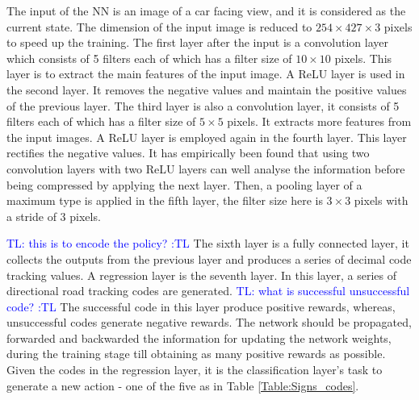 \documentclass{svproc}
\newcommand{\tl}[1]{\textcolor{blue} {TL: #1 :TL} }
\begin{document}
The input of the NN is an image of a car facing view, and it is considered as the current state. The dimension of the input image %
is reduced to $254 \times 427 \times 3$ pixels to speed up the training. The first layer after the input is a convolution layer which consists of 5 filters each of which has a filter size of $10 \times 10$ pixels. This layer is to extract the main features of the input image. A ReLU layer is used in the second layer. It removes the negative values and maintain the positive values of the previous layer. The third layer is also a convolution layer, it consists of 5 filters each of which has a filter size of $5 \times 5$ pixels. It extracts more features from the input images. A ReLU layer is employed again in the fourth layer. This layer rectifies the negative values. It has empirically been found that using two convolution layers with two ReLU layers can well analyse the information before being compressed by applying the next layer. Then, a pooling layer of a maximum type is applied in the fifth layer, the filter size here is $3 \times 3$ pixels with a stride of 3 pixels. 

\tl{this is to encode the policy?}
The sixth layer is a fully connected layer, it collects the outputs from the previous layer and produces a series of decimal code tracking values. A regression layer is the seventh layer. In this layer, a series of directional road tracking codes are generated. \tl{what is successful unsuccessful code?} The successful code in this layer produce positive rewards, whereas, unsuccessful codes generate negative rewards. The network should be propagated, forwarded and backwarded the information for updating the network weights, during the training stage till obtaining as many positive rewards as possible. Given the codes in the regression layer, it is the classification layer's task to generate a new action - one of the five as in Table \ref{Table:Signs_codes}. 
\end{document}
